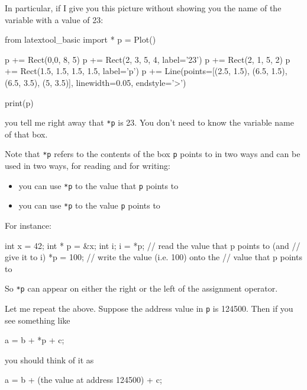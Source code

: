 In particular, if I give you this picture without showing you the name of the variable with a value of 23:

\begin{python}
from latextool_basic import *
p = Plot()

p += Rect(0,0, 8, 5)
p += Rect(2, 3, 5, 4, label='23')
p += Rect(2, 1, 5, 2)
p += Rect(1.5, 1.5, 1.5, 1.5, label='p')
p += Line(points=[(2.5, 1.5), (6.5, 1.5), (6.5, 3.5), (5, 3.5)], linewidth=0.05, endstyle='>')

print(p)
\end{python}

you tell me right away that \texttt{*p} is 23. You don't need to know the variable name of that box.

Note that \texttt{*p} refers to the contents of the box \texttt{p} points to in two ways and can be used in two ways, for reading and for writing:

\begin{itemize}
\item
  you can use \texttt{*p} to  the value that \texttt{p} points
  to
\item
  you can use \texttt{*p} to  the value \texttt{p} points
  to
\end{itemize}

For instance:

\begin{consolethree}[escapeinside=||]
int x = 42;
int * p = &x;
int i;
i = *p;         // read the value that p points to (and
                // give it to i)
*p = 100;       // write the value (i.e. 100) onto the
                // value that p points to
\end{consolethree}


So \texttt{*p} can appear on either the right or the left of the
assignment operator.


Let me repeat the above. Suppose the address value in \texttt{p} is 124500. Then if you see something like

\begin{consolethree}[escapeinside=||]
a = b + *p + c;
\end{consolethree}

you should think of it as

\begin{consolethree}[escapeinside=||]
a = b + (the value at address 124500) + c;
\end{consolethree}

